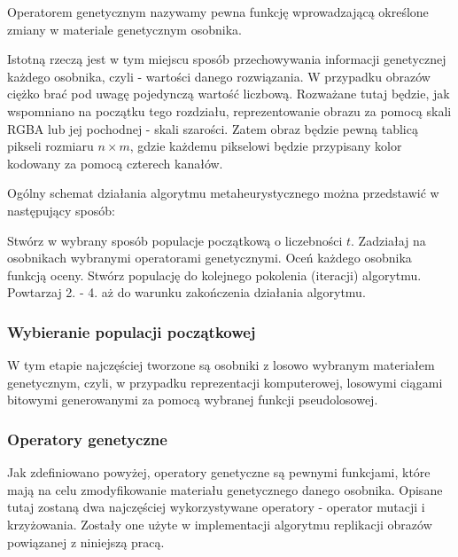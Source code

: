 \begin{definition}
Operatorem genetycznym nazywamy pewna funkcję wprowadzającą określone zmiany w materiale genetycznym osobnika.
\end{definition}

Istotną rzeczą jest w tym miejscu sposób przechowywania informacji genetycznej każdego osobnika, czyli - wartości danego rozwiązania. W przypadku obrazów ciężko brać pod uwagę pojedynczą wartość liczbową. Rozważane tutaj będzie, jak wspomniano na początku tego rozdziału, reprezentowanie obrazu za pomocą skali RGBA lub jej pochodnej - skali szarości. Zatem obraz będzie pewną tablicą pikseli rozmiaru $n \times m$, gdzie każdemu pikselowi będzie przypisany kolor kodowany za pomocą czterech kanałów.

Ogólny schemat działania algorytmu metaheurystycznego można przedstawić w następujący sposób:

\begin{algorithm}
    \begin{algorithmic}[1]
        \State Stwórz w wybrany sposób populacje początkową o liczebności $t$.
        \State Zadziałaj na osobnikach wybranymi operatorami genetycznymi.
        \State Oceń każdego osobnika funkcją oceny.
        \State Stwórz populację do kolejnego pokolenia (iteracji) algorytmu.
        \State Powtarzaj 2. - 4. aż do warunku zakończenia działania algorytmu.
    \end{algorithmic}
\end{algorithm}

\subsubsection{Wybieranie populacji początkowej}
W tym etapie najczęściej tworzone są osobniki z losowo wybranym materiałem genetycznym, czyli, w przypadku reprezentacji komputerowej, losowymi ciągami bitowymi generowanymi za pomocą wybranej funkcji pseudolosowej.

\subsubsection{Operatory genetyczne}
Jak zdefiniowano powyżej, operatory genetyczne są pewnymi funkcjami, które mają na celu zmodyfikowanie materiału genetycznego danego osobnika. Opisane tutaj zostaną dwa najczęściej wykorzystywane operatory - operator mutacji i krzyżowania. Zostały one użyte w implementacji algorytmu replikacji obrazów powiązanej z niniejszą pracą.

